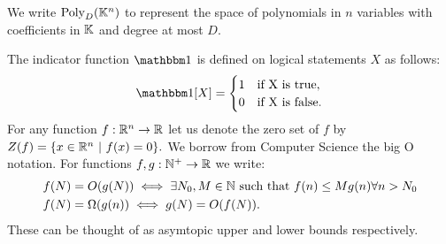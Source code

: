 We write $\text{Poly}_D (\mathbb K^n)$ to represent the space of polynomials in $n$ variables with coefficients in $\mathbb K$ and degree at most $D$.

The indicator function $\OO$ is defined on logical statements $X$ as follows:
\[
    \OO[X] = 
  \begin{cases}
      1 & \text{if X is true}, \\
      0 & \text{if X is false}.
  \end{cases}  
\]
For any function $f : \mathbb R^n \to \mathbb R$ let us denote the zero set of $f$ by $Z(f) = \{x \in \mathbb R^n \ | \ f(x) = 0\}.$
We borrow from Computer Science the big O notation. For functions $f,g : \mathbb N^+ \to \mathbb R$ we write:
\begin{align*}
    f(N) &= O(g(N)) \iff \exists N_0, M \in \mathbb N \text{ such that } f(n) \leq Mg(n) \forall n > N_0 \\
    f(N) &= \Omega(g(n)) \iff g(N) = O(f(N)).
\end{align*}
These can be thought of as asymtopic upper and lower bounds respectively.